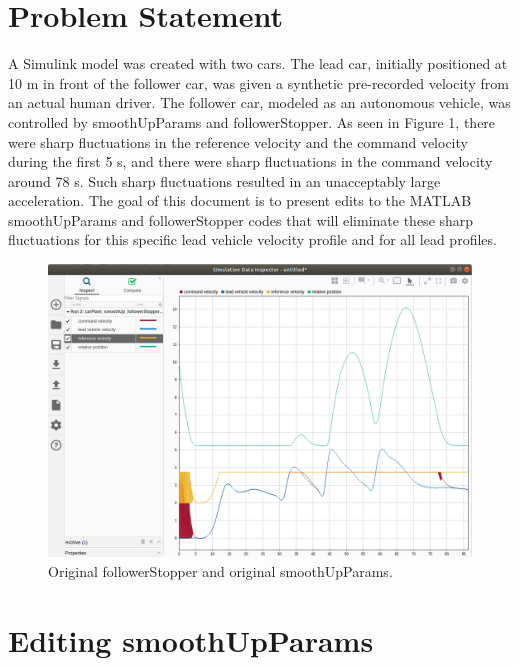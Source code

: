 \documentclass[12pt, letterpaper]{article}
\begin{document}
\section{Problem Statement}
A Simulink model was created with two cars. The lead car, initially positioned at 10 m in front of the follower car, was given a synthetic pre-recorded velocity from an actual human driver. The follower car, modeled as an autonomous vehicle, was controlled by smoothUpParams and followerStopper. As seen in Figure 1, there were sharp fluctuations in the reference velocity and the command velocity during the first 5 s, and there were sharp fluctuations in the command velocity around 78 s. Such sharp fluctuations resulted in an unacceptably large acceleration. The goal of this document is to present edits to the MATLAB smoothUpParams and followerStopper codes that will eliminate these sharp fluctuations for this specific lead vehicle velocity profile and for all lead profiles.

\begin{figure}[h!]
\begin{center}
\includegraphics[width=6in]{originalFS_originalSUP_1}
\caption{Original followerStopper and original smoothUpParams.}
\label{default}
\end{center}
\end{figure}


\section{Editing smoothUpParams}
\end{document}
